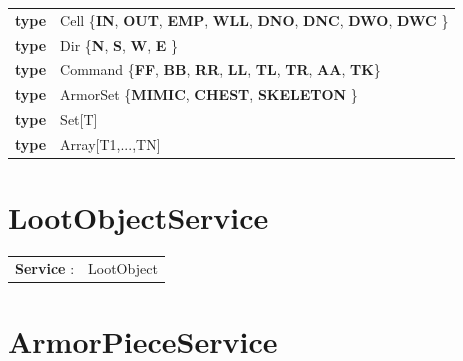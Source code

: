 \documentclass[12pt]{report}
\begin{document}
\begin{tabular}{rl}
    \textbf{type} & \textrm{Cell} \{\textbf{IN}, \textbf{OUT}, \textbf{EMP}, \textbf{WLL}, \textbf{DNO}, \textbf{DNC}, \textbf{DWO}, \textbf{DWC} \} \\
    \textbf{type} & \textrm{Dir} \{\textbf{N}, \textbf{S}, \textbf{W}, \textbf{E} \} \\
    \textbf{type} & \textrm{Command} \{\textbf{FF}, \textbf{BB}, \textbf{RR}, \textbf{LL}, \textbf{TL}, \textbf{TR}, \textbf{AA}, \textbf{TK}\} \\
    \textbf{type} & \textrm{ArmorSet} \{\textbf{MIMIC}, \textbf{CHEST}, \textbf{SKELETON} \} \\
    \textbf{type} & \textrm{Set[T]}  \\
    \textbf{type} & \textrm{Array[T1,...,TN]}  \\
\end{tabular}

\section{LootObjectService}

\begin{tabular}{rl}
    \textbf{Service} : & LootObject
\end{tabular}

\section{ArmorPieceService}
\end{document}
